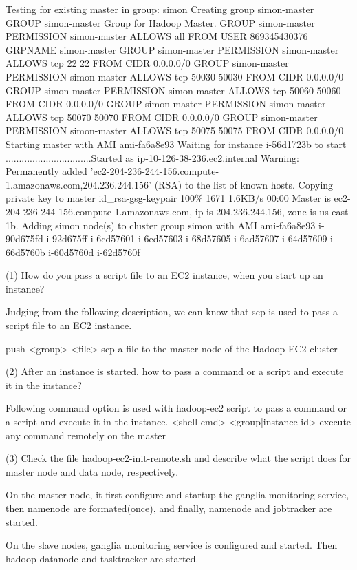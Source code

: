 Testing for existing master in group: simon
Creating group simon-master
GROUP	simon-master	Group for Hadoop Master.
GROUP		simon-master	
PERMISSION		simon-master	ALLOWS	all     FROM	USER	869345430376  GRPNAME	simon-master
GROUP		simon-master	
PERMISSION		simon-master	ALLOWS	tcp	22	22	FROM	CIDR	0.0.0.0/0
GROUP		simon-master	
PERMISSION		simon-master	ALLOWS	tcp	50030	50030	FROM	CIDR	0.0.0.0/0
GROUP		simon-master	
PERMISSION		simon-master	ALLOWS	tcp	50060	50060	FROM	CIDR	0.0.0.0/0
GROUP		simon-master	
PERMISSION		simon-master	ALLOWS	tcp	50070	50070	FROM	CIDR	0.0.0.0/0
GROUP		simon-master	
PERMISSION		simon-master	ALLOWS	tcp	50075	50075	FROM	CIDR	0.0.0.0/0
Starting master with AMI ami-fa6a8e93
Waiting for instance i-56d1723b to start
................................Started as ip-10-126-38-236.ec2.internal
Warning: Permanently added 'ec2-204-236-244-156.compute-1.amazonaws.com,204.236.244.156' (RSA) to the list of known hosts.
Copying private key to master
id_rsa-gsg-keypair                                                                   100\% 1671     1.6KB/s   00:00    
Master is ec2-204-236-244-156.compute-1.amazonaws.com, ip is 204.236.244.156, zone is us-east-1b.
Adding simon node(s) to cluster group simon with AMI ami-fa6a8e93
i-90d675fd
i-92d675ff
i-6cd57601
i-6ed57603
i-68d57605
i-6ad57607
i-64d57609
i-66d5760b
i-60d5760d
i-62d5760f

(1) How do you pass a script file to an EC2 instance, when you start
up an instance?

Judging from the following description, we can know that scp is used
to pass a script file to an EC2 instance. 

push <group> <file> scp a file to the master node of the Hadoop EC2
cluster

(2) After an instance is started, how to pass a command or a script
and execute it in the instance?

Following command option is used with hadoop-ec2 script to pass a
command or a script and execute it in the instance. 
<shell cmd> <group|instance id> execute any command remotely on
the master

(3) Check the file hadoop-ec2-init-remote.sh and describe what the
script does for master node and data node, respectively.

On the master node, it first configure and startup the ganglia
monitoring service, then namenode are formated(once), and finally,
namenode and jobtracker are started. 

On the slave nodes, ganglia monitoring service is configured and
started. Then hadoop datanode and tasktracker are started. 

